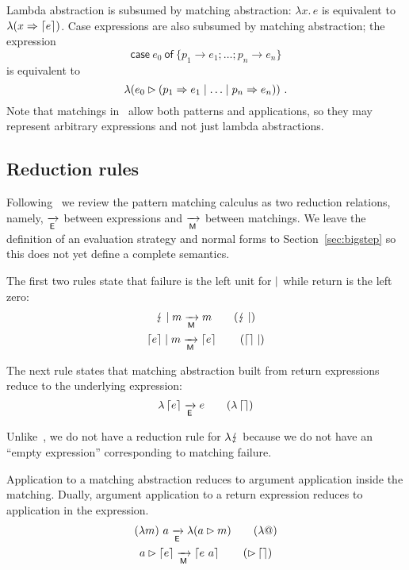 Lambda abstraction is subsumed by matching abstraction:
$\lambda x.\, e$ is equivalent to
$\lambda (x \Rightarrow \left\lceil e\right\rceil)$.  Case expressions are also
subsumed by matching abstraction; the expression
\[
  \textsf{case}~ e_0 ~\textsf{of}~\{p_1\to e_1;\ldots; p_n\to e_n\}
\]
is equivalent to
\[
  \lambda(e_0\rhd (p_1 \Rightarrow e_1\mid\ldots \mid p_n \Rightarrow e_n)) \ .
\]
%
Note that matchings in \lambdaPMC\ allow both patterns and
applications, so they may represent arbitrary expressions
and not just lambda abstractions.  


\subsection{Reduction rules}\label{sec:reduction}
Following~\cite{kahl_2004} we review the pattern matching calculus as
two reduction relations, namely, $\xrightarrow[\textsf{E}]{}$ between expressions and
$\xrightarrow[\textsf{M}]{}$ between matchings. We leave the definition of an
evaluation strategy and normal forms to
Section~\ref{sec:bigstep} so this does not yet define a complete semantics.

The first two rules state that failure is the left unit for
$\mid$ while return is the left zero:
\begin{gather}
  \matchalt{\matchfail}{m} \matred m \tag{$\matchfail\amatchalt$}  \\
  \matchalt{\matchreturn{e}}{m} \matred \matchreturn{e} \tag{$\matchreturn{}\amatchalt$}
\end{gather}

The next rule states that matching abstraction built from return expressions
reduce to the underlying expression:
\begin{equation}
  \lambda \matchreturn{e} \expred e  \tag{$\lambda\matchreturn{}$} 
\end{equation}

Unlike~\cite{kahl_2004}, we do not have a reduction rule for $\lambda \lightning$
because we do not have an ``empty expression'' corresponding to
matching failure. 

Application to a matching abstraction reduces to
argument application inside the matching.
Dually, argument application to a return expression reduces
to application in the expression.
\begin{gather}
  (\lambda m)~ a \expred \lambda(\matcharg{a}{m}) \tag{$\lambda @$}\\
  \matcharg{a}{\matchreturn{e}} \matred \matchreturn{e~a} \tag{$\amatcharg\matchreturn{}$} 
\end{gather}

